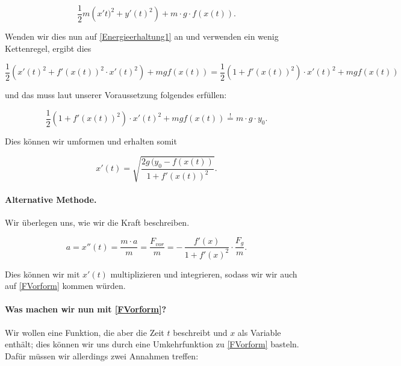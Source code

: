 \begin{equation}\label{Energieerhaltung1}
 \frac{1}{2}m \left( x't)^2+y'(t)^2 \right) + m \cdot g\cdot f(x(t)).
\end{equation}


Wenden wir dies nun auf \ref{Energieerhaltung1} an und verwenden ein wenig Kettenregel, ergibt dies

\begin{equation}\label{Energieerhaltung2}
 \frac{1}{2} \left( x'(t)^2 + f'(x(t))^2 \cdot x'(t)^2 \right) + mgf(x(t))
 = \frac{1}{2} \left( 1+ f'(x(t))^2 \right) \cdot x'(t)^2 + mgf(x(t))
\end{equation}

und das muss laut unserer Voraussetzung folgendes erfüllen:

\begin{equation}\label{Energieerhaltung3}
 \frac{1}{2} \left( 1+f'(x(t))^2 \right) \cdot x'(t)^2 + mgf(x(t)) \overset{!}{=} m\cdot g\cdot y_0.
\end{equation}

Dies können wir umformen und erhalten somit

\begin{equation}\label{FVorform}
 x'(t)=\sqrt{\frac{2g\,(y_0-f(x(t))}{1+f'(x(t))^2}}.
\end{equation}

\paragraph{Alternative Methode.}Wir überlegen uns, wie wir die Kraft beschreiben.

$$
a=x''(t)= \frac{m \cdot a}{m}=\frac{F_{vor}}{m}=-\,\frac{f'(x)}{1+f'(x)^2} \cdot \frac{F_g}{m}.
$$

Dies können wir mit $x'(t)$ multiplizieren und integrieren, sodass wir wir auch auf \ref{FVorform} kommen würden.

\paragraph{Was machen wir nun mit \ref{FVorform}?}

Wir wollen eine Funktion, die aber die Zeit $t$ beschreibt und $x$ als Variable enthält; dies können wir uns durch eine Umkehrfunktion zu \ref{FVorform} basteln.
Dafür müssen wir allerdings zwei Annahmen treffen:

